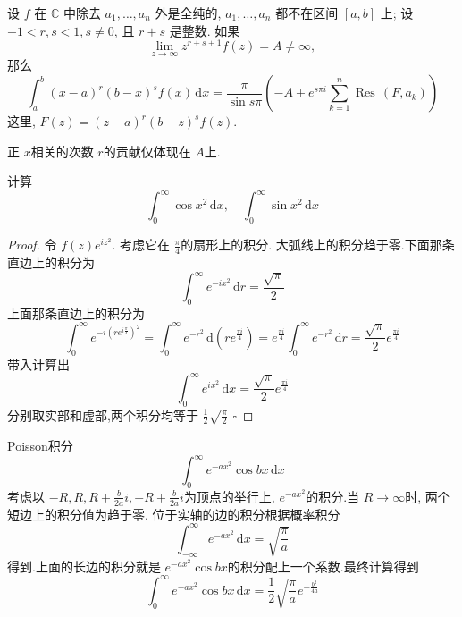 \documentclass[../../复变函数.tex]{subfiles}
\begin{document}
\begin{theorem}
    设 $f$ 在 $\mathbb{C}$ 中除去 $a_1, \dots, a_n$ 外是全纯的, $a_1, \dots, a_n$ 都不在区间 $[a, b]$ 上; 设 $-1 < r, s < 1, s \neq 0$, 且 $r+s$ 是整数. 如果
$$ \lim_{z\to\infty} z^{r+s+1} f(z) = A \neq \infty, $$
那么
$$ \int_a^b (x-a)^r (b-x)^s f(x) \,\mathrm{d}x = \frac{\pi  }{\sin s\pi  }\left( -A+ e^{s\pi i} \sum _{k= 1}^{n}\operatorname{Res}\,\left(F,a_{k}  \right) \right)  $$
这里, $F(z) = (z-a)^r (b-z)^s f(z)$.
\end{theorem}
\begin{remark}
    正 \(  x  \)相关的次数 \(  r  \)的贡献仅体现在 \(  A  \)上.   
\end{remark}





\begin{proposition}
    计算 \[
    \int_{0}^{\infty}\cos x^{2}\,\mathrm{d} x,\quad \int_{0}^{\infty}\sin x^{2}\,\mathrm{d} x
    \]
\end{proposition}
\begin{proof}
    令 \(  f\left( z \right)e^{iz^{2}}   \). 
    考虑它在 \(  \frac{\pi  }{4 }   \)的扇形上的积分. 大弧线上的积分趋于零.下面那条直边上的积分为 \[
    \int_{0}^{\infty}e^{-ix^{2}}\,\mathrm{d} r= \frac{\sqrt{\pi } }{2 } 
    \] 上面那条直边上的积分为 \[
    \int_{0}^{\infty}e^{-i \left( re^{i\frac{\pi  }{4 } } \right)^{2} }= \int_{0}^{\infty}e^{-r^{2}}\,\mathrm{d} \left( re^{\frac{\pi i }{4 } } \right)= e^{\frac{\pi i }{4 } }\int_{0}^{\infty}e^{-r^{2}}\,\mathrm{d} r= \frac{\sqrt{\pi } }{2 }e^{\frac{\pi i }{4 } }  
    \]带入计算出 \[
    \int_{0}^{\infty}e^{ix^{2}}\,\mathrm{d} x= \frac{\sqrt{\pi } }{2 }e^{\frac{\pi i }{4 } } 
    \]分别取实部和虚部,两个积分均等于 \(  \frac{1 }{2 }\sqrt{\frac{\pi  }{2 } }   \) 
    \hfill $\square$
\end{proof}

\begin{proposition}
    Poisson积分 \[
    \int_{0}^{\infty}e^{-ax^{2}}\cos bx\,\mathrm{d} x
    \]考虑以 \(  -R,R,R+ \frac{b }{2a }i, -R+ \frac{b }{2a }i    \)为顶点的举行上, \(  e^{-ax^{2}}  \)的积分.当 \(  R\to \infty  \)时, 两个短边上的积分值为趋于零.  位于实轴的边的积分根据概率积分 \[
    \int_{-\infty}^{\infty}e^{-ax^{2}}\,\mathrm{d} x= \sqrt{\frac{\pi  }{a } }
    \]得到.上面的长边的积分就是  \(  e^{-ax^{2}}\cos bx  \)的积分配上一个系数.最终计算得到 \[
    \int_{0}^{\infty}e^{-ax^{2}}\cos bx\,\mathrm{d} x= \frac{1 }{2 }\sqrt{\frac{\pi  }{a } }e^{-\frac{b^{2} }{4a } } 
    \] 
\end{proposition}
\end{document}
